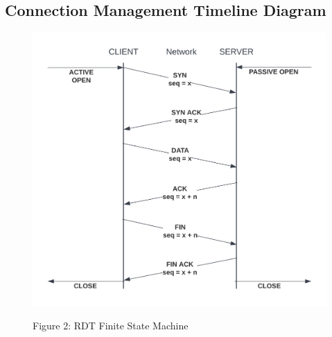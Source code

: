 \subsection{Connection Management Timeline Diagram}
\begin{figure}[H]
\begin{center}
\includegraphics[width=170mm]{images/timeline.png}
\end{center}
\begin{center}
    Figure 2: RDT Finite State Machine
\end{center}
\end{figure}